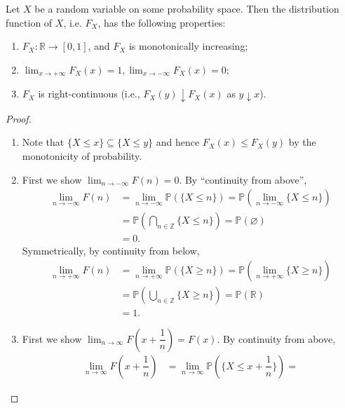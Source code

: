 \documentclass[11pt,singlecolumn, openany, citestyle=authoryear]{elegantbook}
\begin{document}
\begin{CJK}{UTF8}{gbsn}
\begin{lemma}\label{distribution_func}
    Let $X$ be a random variable on some probability space. Then the distribution
function of $X$, i.e. $F_X$, has the following properties:
\begin{enumerate}
    \item {$F_X : \mathbb{R} \to [0, 1]$, and $F_X$ is monotonically increasing;}
    \item {$\displaystyle \lim_{x\to +\infty} F_X (x) = 1, \lim_{x \to -\infty} F_X (x) = 0$;}
    \item {$F_X$ is right-continuous (i.e., $F_X(y) \downarrow F_X(x)$ as $y \downarrow x$).}
\end{enumerate}
\end{lemma}
\begin{proof}
    \begin{enumerate}
        \item Note that $\{X \leqslant x\}\subseteq \{X \leqslant y\}$ and hence 
        $F_X(x)\leqslant F_X(y)$ by the monotonicity of probability.
        \item First we show $\displaystyle \lim_{n \to -\infty}F(n)=0$. By 
        ``continuity from above'', 
        \begin{align*}
            \lim_{n \to -\infty}F(n)&= 
            \lim_{n \to -\infty}\mathbb{P}(\{X \leqslant n\}) 
            = \mathbb{P}(\lim_{n \to -\infty}\{X\leqslant n\})\\
            &= \mathbb{P}\left(\bigcap_{n \in \mathbb{Z}}\{X \leqslant n\}\right)
            = \mathbb{P}(\varnothing)\\
            &=0.
        \end{align*}
        Symmetrically, by continuity from below,
        \begin{align*}
            \lim_{n \to +\infty}F(n)&= 
            \lim_{n \to +\infty}\mathbb{P}(\{X \geqslant n\}) 
            = \mathbb{P}(\lim_{n \to +\infty}\{X\geqslant n\})\\
            &= \mathbb{P}\left(\bigcup_{n \in \mathbb{Z}}\{X \geqslant n\}\right)
            = \mathbb{P}(\mathbb{R})\\
            &=1.
        \end{align*}
        \item First we show $\displaystyle \lim_{n \to \infty}F(x+\dfrac{1}{n})=F(x)$.
        By continuity from above, 
        \begin{align*}
        \displaystyle \lim_{n \to \infty}F(x+\dfrac{1}{n}) &= 
        \lim_{n \to \infty}\mathbb{P}(\{X\leqslant x+\dfrac{1}{n}\})= 

\end{align*}
\end{enumerate}
\end{proof}
\end{CJK}
\end{document}
